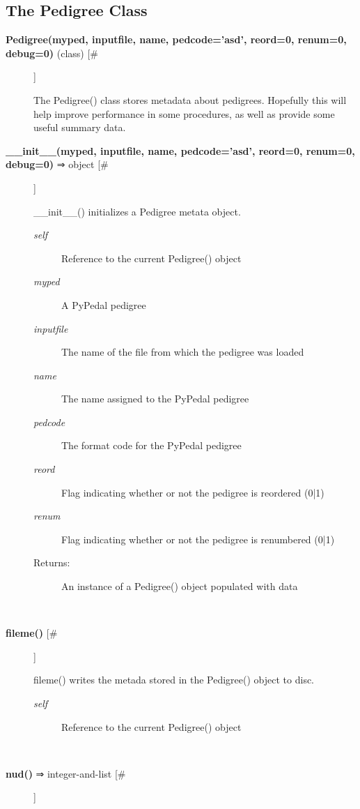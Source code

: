 \documentclass[10pt]{article}
\begin{document}
\subsection*{The Pedigree Class}
\begin{description}
\item[\textbf{Pedigree(myped, inputfile, name, pedcode='asd', reord=0, renum=0, debug=0)}
 (class) [\#]]

 The Pedigree() class stores metadata about pedigrees. Hopefully this will help improve performance in some procedures, as well as provide some useful summary data.

\item[\textbf{\_\_init\_\_(myped, inputfile, name, pedcode='asd', reord=0, renum=0, debug=0)}
 ⇒ object [\#]]

 \_\_init\_\_() initializes a Pedigree metata object.
\begin{description}
\item[\emph{self}
] Reference to the current Pedigree() object
\item[\emph{myped}
] A PyPedal pedigree
\item[\emph{inputfile}
] The name of the file from which the pedigree was loaded
\item[\emph{name}
] The name assigned to the PyPedal pedigree
\item[\emph{pedcode}
] The format code for the PyPedal pedigree
\item[\emph{reord}
] Flag indicating whether or not the pedigree is reordered (0|1)
\item[\emph{renum}
] Flag indicating whether or not the pedigree is renumbered (0|1)
\item[Returns:] An instance of a Pedigree() object populated with data

\end{description}
\\ 

\item[\textbf{fileme()}
 [\#]]

 fileme() writes the metada stored in the Pedigree() object to disc.
\begin{description}
\item[\emph{self}
] Reference to the current Pedigree() object

\end{description}
\\ 

\item[\textbf{nud()}
 ⇒ integer-and-list [\#]]


\end{description}
\end{document}
